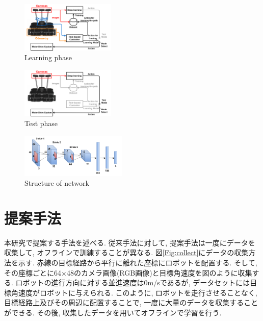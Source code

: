 \documentclass{ujarticle}
\begin{document}
\begin{figure}[t]
		\centering
		\includegraphics[width=0.4\textwidth]{img/si2020-okada.png}
		\caption{Learning phase}
		\label{Fig:si2020-okada}
\end{figure}

\begin{figure}[t]
	\centering
	\includegraphics[width=0.4\textwidth]{img/si2020-okada-test.png}
	\caption{Test phase}
	\label{Fig:si2020-okada-test}
\end{figure}

\begin{figure}[h]
	\centering
	\includegraphics[width=0.45\textwidth]{img/cnn.png}
	\caption{Structure of network}
	\label{Fig:cnn}
\end{figure}

\newpage
\section{提案手法}%
本研究で提案する手法を述べる. 従来手法に対して, 提案手法は一度にデータを収集して, オフラインで訓練することが異なる. 図\ref{Fig:collect}にデータの収集方法を示す. 赤線の目標経路から平行に離れた座標にロボットを配置する. そして, その座標ごとに64×48のカメラ画像(RGB画像)と目標角速度を図のように収集する. ロボットの進行方向に対する並進速度は0m/sであるが, データセットには目標角速度がロボットに与えられる. このように, ロボットを走行させることなく, 目標経路上及びその周辺に配置することで, 一度に大量のデータを収集することができる. その後, 収集したデータを用いてオフラインで学習を行う.
\end{document}
